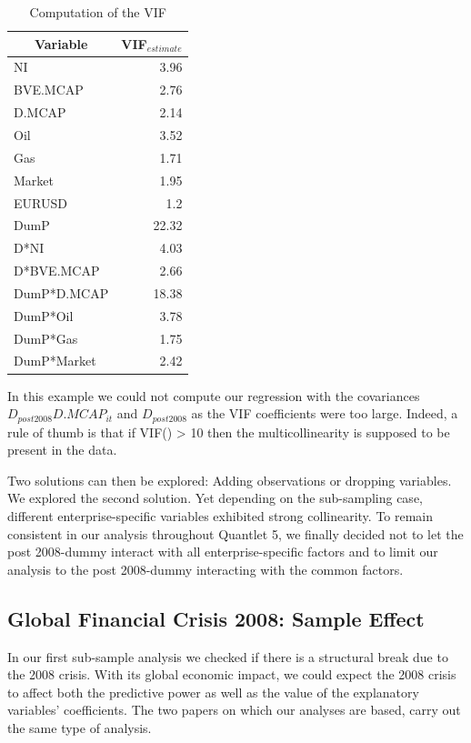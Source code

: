 \documentclass[a4paper]{article}
\begin{document}
\begin{table}[ht]
\centering
\begin{tabular}{l|r}
\hline
\hline
\multicolumn{1}{c|}{Variable} & \multicolumn{1}{c}{VIF$_{estimate}$} \\ 
\hline
NI & 3.96 \\ 
BVE.MCAP & 2.76 \\ 
D.MCAP & 2.14 \\ 
Oil & 3.52 \\ 
Gas & 1.71 \\ 
Market & 1.95 \\ 
EURUSD & 1.2 \\ 
DumP & 22.32 \\ 
D*NI & 4.03 \\ 
D*BVE.MCAP & 2.66 \\ 
DumP*D.MCAP & 18.38 \\ 
DumP*Oil & 3.78 \\ 
DumP*Gas & 1.75 \\ 
DumP*Market & 2.42 \\ 
\hline
\hline
\end{tabular}
\label{}
\caption{Computation of the VIF}
\end{table}

In this example we could not compute our regression with the covariances $D_{post2008}D.MCAP_{it}$ and $D_{post2008}$ as the VIF coefficients were too large. Indeed, a rule of thumb is that if VIF() > 10 then the multicollinearity is supposed to be present in the data.

Two solutions can then be explored: Adding observations or dropping variables. We explored the second solution. Yet depending on the sub-sampling case, different enterprise-specific variables exhibited strong collinearity. To remain consistent in our analysis throughout Quantlet 5, we finally decided not to let the post 2008-dummy interact with all enterprise-specific factors and to limit our analysis to the post 2008-dummy interacting with the common factors.

\subsection{Global Financial Crisis 2008: Sample Effect}

In our first sub-sample analysis we checked if there is a structural break due to the 2008 crisis. With its global economic impact, we could expect the 2008 crisis to affect both the predictive power as well as the value of the explanatory variables' coefficients. The two papers on which our analyses are based, carry out the same type of analysis. 
\end{document}

